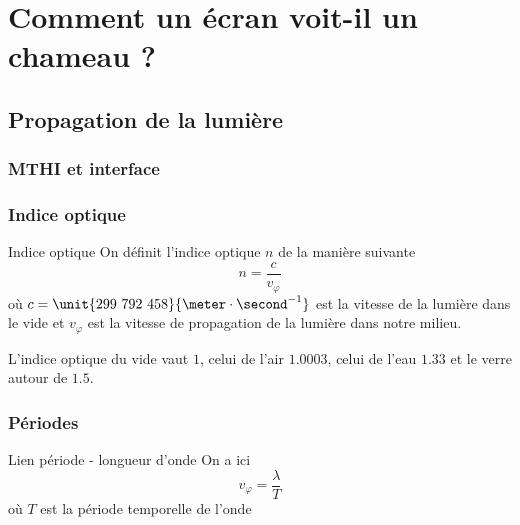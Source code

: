\documentclass{beamercours}
\begin{document}
\section{Comment un écran voit-il un chameau ?}
\subsection{Propagation de la lumière}

\begin{frame}
	\frametitle{MTHI et interface}
\end{frame}

\begin{frame}
\frametitle{Indice optique}
\begin{définition}{Indice optique}{}
On définit l'indice optique $n$ de la manière suivante
\begin{equation*}
	n=\frac{c}{v_\varphi}
\end{equation*}
où $c =\unit{299~792~458}{\meter\cdot\second^{-1}}$ est la vitesse de la lumière dans le vide et $v_\varphi$ est la vitesse de propagation de la lumière dans notre milieu.
\end{définition}
L'indice optique du vide vaut $1$, celui de l'air $1.0003$, celui de l'eau $1.33$ et le verre autour de $1.5$.
\end{frame}

\begin{frame}
\frametitle{Périodes}
\begin{remarque}{Lien période - longueur d'onde}{}
	On a ici
	\begin{equation*}
		v_\varphi = \frac{\lambda}{T}
	\end{equation*}
	où $T$ est la période temporelle de l'onde
\end{remarque}
\end{frame}
\end{document}
